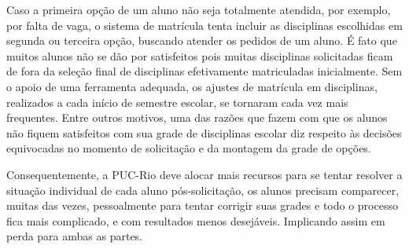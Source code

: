 Caso a primeira opção de um aluno não seja totalmente atendida, por exemplo, por falta de vaga, o sistema de matrícula tenta incluir as disciplinas escolhidas em segunda ou terceira opção, buscando atender os pedidos de um aluno. É fato que muitos alunos não se dão por satisfeitos pois muitas disciplinas solicitadas ficam de fora da seleção final de disciplinas efetivamente matriculadas inicialmente. Sem o apoio de uma ferramenta adequada, os ajustes de matrícula em disciplinas, realizados a cada início de semestre escolar, se tornaram cada vez mais frequentes. Entre outros motivos, uma das razões que fazem com que os alunos não fiquem satisfeitos com sua grade de disciplinas escolar diz respeito às decisões equivocadas no momento de solicitação e da montagem da grade de opções.

Consequentemente, a PUC-Rio deve alocar mais recursos para se tentar resolver a situação individual de cada aluno pós-solicitação, os alunos precisam comparecer, muitas das vezes, pessoalmente para tentar corrigir suas grades e todo o processo fica mais complicado, e com resultados menos desejáveis. Implicando assim em perda para ambas as partes.

